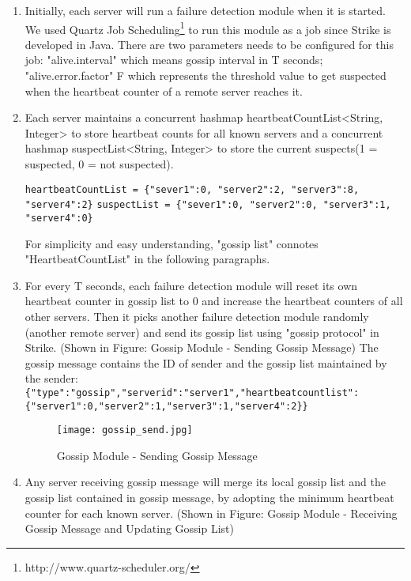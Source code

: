 \documentclass[dareport.tex]{subfiles}
\begin{document}
\begin{enumerate}[leftmargin=*]
\item Initially, each server will run a failure detection module when it is started. We used Quartz Job Scheduling\footnote{http://www.quartz-scheduler.org/} to run this module as a job since Strike is developed in Java. There are two parameters needs to be configured for this job: "alive.interval" which means gossip interval in T seconds; "alive.error.factor" F which represents the threshold value to get suspected when the heartbeat counter of a remote server reaches it.

\item Each server maintains a concurrent hashmap heartbeatCountList<String, Integer> to store heartbeat counts for all known servers and a concurrent hashmap suspectList<String, Integer> to store the current suspects(1 = suspected, 0 = not suspected).

\verb|heartbeatCountList = {"sever1":0, "server2":2, "server3":8, "server4":2}|
\verb|suspectList = {"sever1":0, "server2":0, "server3":1, "server4":0}|

For simplicity and easy understanding, "gossip list" connotes "HeartbeatCountList" in the following paragraphs.

\item For every T seconds, each failure detection module will reset its own heartbeat counter in gossip list to 0 and increase the heartbeat counters of all other servers. Then it picks another failure detection module randomly (another remote server) and send its gossip list using "gossip protocol" in Strike. (Shown in Figure: Gossip Module - Sending Gossip Message) The gossip message contains the ID of sender and the gossip list maintained by the sender:
\verb|{"type":"gossip","serverid":"server1","heartbeatcountlist":{"server1":0,"server2":1,"server3":1,"server4":2}}|

\begin{figure}[h]
\label{fig:Gossip Module - Sending Gossip Message}
\texttt{[image: gossip\_send.jpg]}
\caption{Gossip Module - Sending Gossip Message}
\centering
\end{figure}

\item Any server receiving gossip message will merge its local gossip list and the gossip list contained in gossip message, by adopting the minimum heartbeat counter for each known server. (Shown in Figure: Gossip Module - Receiving Gossip Message and Updating Gossip List)


\end{enumerate}
\end{document}
